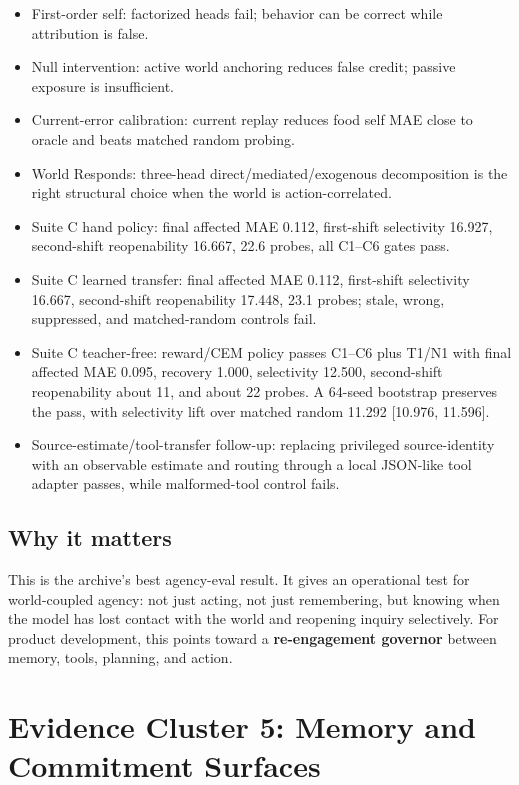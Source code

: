 \documentclass[11pt]{article}
\begin{document}
\begin{itemize}
  \item First-order self: factorized heads fail; behavior can be correct while
  attribution is false.
  \item Null intervention: active world anchoring reduces false credit; passive
  exposure is insufficient.
  \item Current-error calibration: current replay reduces food self MAE close
  to oracle and beats matched random probing.
  \item World Responds: three-head direct/mediated/exogenous decomposition is
  the right structural choice when the world is action-correlated.
  \item Suite C hand policy: final affected MAE 0.112, first-shift selectivity
  16.927, second-shift reopenability 16.667, 22.6 probes, all C1--C6 gates pass.
  \item Suite C learned transfer: final affected MAE 0.112, first-shift
  selectivity 16.667, second-shift reopenability 17.448, 23.1 probes; stale,
  wrong, suppressed, and matched-random controls fail.
  \item Suite C teacher-free: reward/CEM policy passes C1--C6 plus T1/N1 with
  final affected MAE 0.095, recovery 1.000, selectivity 12.500, second-shift
  reopenability about 11, and about 22 probes. A 64-seed bootstrap preserves
  the pass, with selectivity lift over matched random 11.292 [10.976, 11.596].
  \item Source-estimate/tool-transfer follow-up: replacing privileged
  source-identity with an observable estimate and routing through a local
  JSON-like tool adapter passes, while malformed-tool control fails.
\end{itemize}

\subsection{Why it matters}

This is the archive's best agency-eval result. It gives an operational test for
world-coupled agency: not just acting, not just remembering, but knowing when
the model has lost contact with the world and reopening inquiry selectively.
For product development, this points toward a \textbf{re-engagement governor}
between memory, tools, planning, and action.

\section{Evidence Cluster 5: Memory and Commitment Surfaces}
\end{document}
